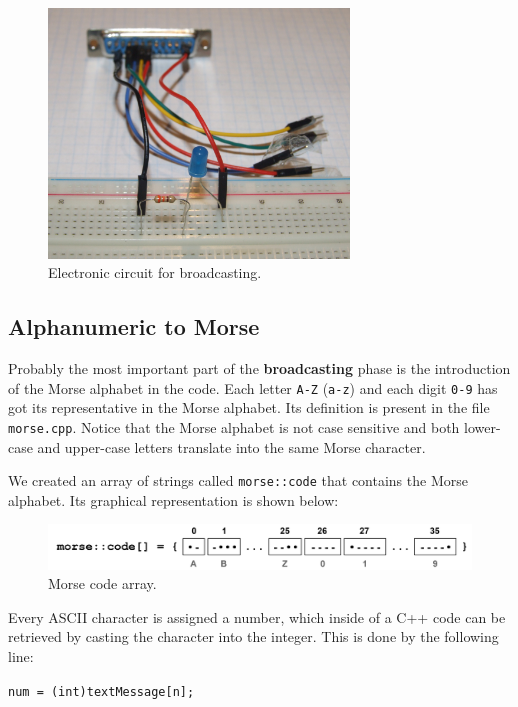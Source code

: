\documentclass[12pt]{report}
\begin{document}
\begin{figure}[H]
\centering\includegraphics[width=8cm]{broadcast_circuit}
\caption{Electronic circuit for broadcasting.}				
\label{fig:broadcast_circuit}
\end{figure}




\subsection{Alphanumeric to Morse} \label{sec:asciitomorse}

Probably the most important part of the \textbf{broadcasting} phase is the introduction of the Morse alphabet in the code. Each letter \verb|A-Z| (\verb|a-z|) and each digit \verb|0-9| has got its representative in the Morse alphabet. Its definition is present in the file \verb|morse.cpp|. Notice that the Morse alphabet is not case sensitive and both lower-case and upper-case letters translate into the same Morse character.

We created an array of strings called \verb|morse::code| that contains the Morse alphabet. Its graphical representation is shown below:

\begin{figure}[H]
\centering\includegraphics[scale=0.1]{morse--code}
\caption{Morse code array.}				
\label{fig:morse_code_array}
\end{figure}

Every ASCII character is assigned a number, which inside of a C++ code can be retrieved by casting the character into the integer. This is done by the following line: 

\begin{snugshade}
\verb|num = (int)textMessage[n];|
\end{snugshade}
\end{document}
